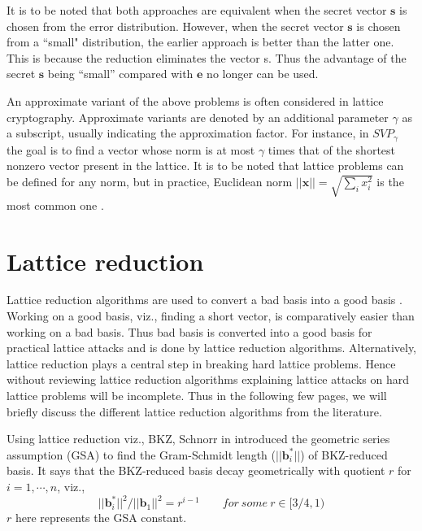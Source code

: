 It is to be noted that both approaches are equivalent when the secret vector $\pmb{s}$ is chosen from the error distribution.
However, when the secret vector $\pmb{s}$ is chosen from a ``small" distribution, the earlier approach is better than the latter one.
This is because the reduction eliminates the vector s. Thus the advantage of the secret $\pmb{s}$ being ``small'' compared with $\pmb{e}$ no longer can be used.



An approximate variant of the above problems is often considered in lattice cryptography.
Approximate variants are denoted by an additional parameter $\gamma$ as a subscript, usually indicating the approximation factor.
For instance, in $SVP_\gamma$ the goal is to find a vector whose norm is at most $\gamma$ times that of the shortest nonzero vector present in the lattice.
It is to be noted that lattice problems can be defined for any norm, but in practice, Euclidean norm $||\pmb{x}||=\sqrt{\sum_i x^2_i}$ is the most common one \cite{peikert2008limits}.

\section{Lattice reduction}
Lattice reduction algorithms are used to convert a bad basis into a good basis \cite{laarhoven2012solving}.
Working on a good basis, viz., finding a short vector, is comparatively easier than working on a bad basis.
Thus bad basis is converted into a good basis for practical lattice attacks and is done by lattice reduction algorithms.
Alternatively, lattice reduction plays a central step in breaking hard lattice problems.
Hence without reviewing lattice reduction algorithms explaining lattice attacks on hard lattice problems will be incomplete.
Thus in the following few pages, we will briefly discuss the different lattice reduction algorithms from the literature.


Using lattice reduction viz., BKZ, Schnorr in \cite{schnorr2003lattice} introduced the geometric series assumption (GSA) to find the Gram-Schmidt length ($||\pmb{b}_i^*||$) of BKZ-reduced basis.
It says that the BKZ-reduced basis decay geometrically with quotient $r$ for $i = 1,\cdots,n$, viz.,
\begin{equation*}
    ||\pmb{b}_i^*||^2/||\pmb{b}_1||^2=r^{i-1} \hspace{2em} for \ some \ r \in [3/4,1)
\end{equation*}
$r$ here represents the GSA constant.


